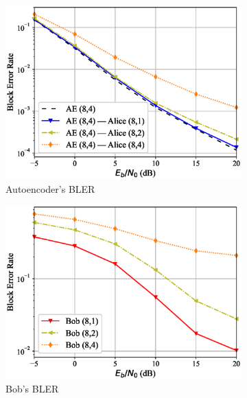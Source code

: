 \begin{figure}
	\begin{subfigure}{0.3\textwidth}
		\includegraphics[width=\linewidth]{figs/covert_autoencoder_bler_rician}
		\caption{Autoencoder's BLER}
		\label{fig:rician_resutls_ae}
	\end{subfigure}
	\hspace*{\fill}
	\begin{subfigure}{0.3\textwidth}
		\includegraphics[width=\linewidth]{figs/bob_bler_rician}
		\caption{Bob's BLER}
		\label{fig:rician_resutls_bob}	
	\end{subfigure}
	\hspace*{\fill}
	\begin{subfigure}{0.3\textwidth}

\end{subfigure}
\end{figure}
